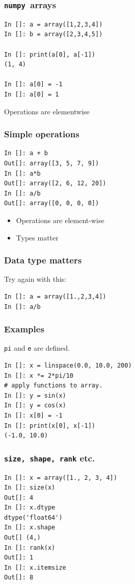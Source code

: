 \documentclass[14pt,compress]{beamer}
\newcounter{time}
\newcommand{\inctime}[1]{\addtocounter{time}{#1}{\tiny \thetime\ m}}
\newcommand{\typ}[1]{\lstinline{#1}}
\newcommand{\num}{\texttt{numpy}}
\begin{document}
\begin{frame}[fragile]
  \frametitle{\num\ arrays}
\begin{lstlisting}
In []: a = array([1,2,3,4])
In []: b = array([2,3,4,5])

In []: print(a[0], a[-1])
(1, 4)

In []: a[0] = -1
In []: a[0] = 1
\end{lstlisting}
Operations are elementwise
\end{frame}

\begin{frame}[fragile]
  \frametitle{Simple operations}
\begin{lstlisting}
In []: a + b
Out[]: array([3, 5, 7, 9])
In []: a*b
Out[]: array([2, 6, 12, 20])
In []: a/b
Out[]: array([0, 0, 0, 0])
\end{lstlisting}
  \begin{itemize}
  \item Operations are \alert{element-wise}
  \item Types matter
  \end{itemize}
  \inctime{10}
\end{frame}

\begin{frame}[fragile]
  \frametitle{Data type matters}
  Try again with this:
\begin{lstlisting}
In []: a = array([1.,2,3,4])
In []: a/b
\end{lstlisting}
\end{frame}

\begin{frame}[fragile]
  \frametitle{Examples}
\noindent \typ{pi} and \typ{e} are defined.
\begin{lstlisting}
In []: x = linspace(0.0, 10.0, 200)
In []: x *= 2*pi/10
# apply functions to array.
In []: y = sin(x)
In []: y = cos(x)
In []: x[0] = -1
In []: print(x[0], x[-1])
(-1.0, 10.0)
\end{lstlisting}
\end{frame}

\begin{frame}[fragile]
    \frametitle{\typ{size, shape, rank} etc.}
\vspace*{-8pt}
\begin{lstlisting}
In []: x = array([1., 2, 3, 4])
In []: size(x)
Out[]: 4
In []: x.dtype
dtype('float64')
In []: x.shape
Out[] (4,)
In []: rank(x)
Out[]: 1
In []: x.itemsize
Out[]: 8
\end{lstlisting}
\end{frame}
\end{document}
